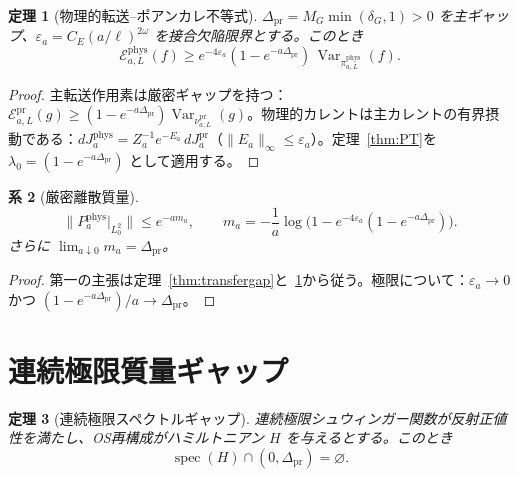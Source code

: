 \documentclass[12pt]{article}
\theoremstyle{plain}
\newtheorem{theorem}{定理}[section]
\newtheorem{corollary}[theorem]{系}
\theoremstyle{definition}
\numberwithin{equation}{section}
\newcommand{\Var}{\operatorname{Var}}
\newcommand{\spec}{\operatorname{spec}}
\newcommand{\pr}{\mathrm{pr}}
\newcommand{\phys}{\mathrm{phys}}
\begin{document}
\begin{theorem}[物理的転送--ポアンカレ不等式]\label{thm:physicalPoincare}
$\Delta_{\pr}=M_G\min(\delta_G,1)>0$ を主ギャップ、$\varepsilon_a=C_E(a/\ell)^{2\omega}$ を接合欠陥限界とする。このとき
\begin{equation}
\boxed{\mathcal{E}_{a,L}^{\phys}(f) \geq e^{-4\varepsilon_a}(1-e^{-a\Delta_{\pr}})\,\Var_{\pi_{a,L}^{\phys}}(f).}
\end{equation}
\end{theorem}

\begin{proof}
主転送作用素は厳密ギャップを持つ：$\mathcal{E}_{a,L}^{\pr}(g)\geq(1-e^{-a\Delta_{\pr}})\Var_{\nu_{a,L}^{\pr}}(g)$。物理的カレントは主カレントの有界摂動である：$dJ_a^{\phys}=Z_a^{-1}e^{-E_a}\,dJ_a^{\pr}$（$\|E_a\|_\infty\leq\varepsilon_a$）。定理~\ref{thm:PT}を $\lambda_0=(1-e^{-a\Delta_{\pr}})$ として適用する。
\end{proof}

\begin{corollary}[厳密離散質量]\label{cor:discretemass}
\begin{equation}
\|P_a^{\phys}|_{L^2_0}\| \leq e^{-am_a},\qquad
m_a = -\frac{1}{a}\log\bigl(1-e^{-4\varepsilon_a}(1-e^{-a\Delta_{\pr}})\bigr).
\end{equation}
さらに $\lim_{a\downarrow 0}m_a = \Delta_{\pr}$。
\end{corollary}

\begin{proof}
第一の主張は定理~\ref{thm:transfergap}と~\ref{thm:physicalPoincare}から従う。極限について：$\varepsilon_a\to 0$ かつ $(1-e^{-a\Delta_{\pr}})/a\to\Delta_{\pr}$。
\end{proof}

\section{連続極限質量ギャップ}\label{sec:continuumgap}

\begin{theorem}[連続極限スペクトルギャップ]\label{thm:continuumgap}
連続極限シュウィンガー関数が反射正値性を満たし、OS再構成がハミルトニアン $H$ を与えるとする。このとき
\begin{equation}
\boxed{\spec(H)\cap(0,\Delta_{\pr}) = \varnothing.}
\end{equation}
\end{theorem}
\end{document}
